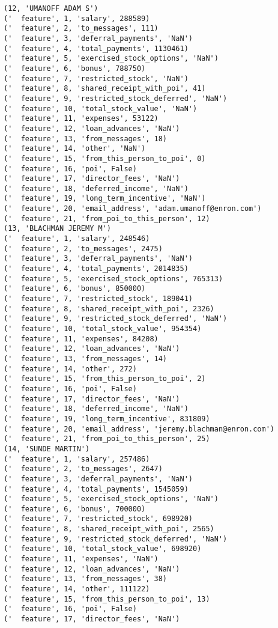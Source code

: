 \begin{verbatim}
(12, 'UMANOFF ADAM S')
('  feature', 1, 'salary', 288589)
('  feature', 2, 'to_messages', 111)
('  feature', 3, 'deferral_payments', 'NaN')
('  feature', 4, 'total_payments', 1130461)
('  feature', 5, 'exercised_stock_options', 'NaN')
('  feature', 6, 'bonus', 788750)
('  feature', 7, 'restricted_stock', 'NaN')
('  feature', 8, 'shared_receipt_with_poi', 41)
('  feature', 9, 'restricted_stock_deferred', 'NaN')
('  feature', 10, 'total_stock_value', 'NaN')
('  feature', 11, 'expenses', 53122)
('  feature', 12, 'loan_advances', 'NaN')
('  feature', 13, 'from_messages', 18)
('  feature', 14, 'other', 'NaN')
('  feature', 15, 'from_this_person_to_poi', 0)
('  feature', 16, 'poi', False)
('  feature', 17, 'director_fees', 'NaN')
('  feature', 18, 'deferred_income', 'NaN')
('  feature', 19, 'long_term_incentive', 'NaN')
('  feature', 20, 'email_address', 'adam.umanoff@enron.com')
('  feature', 21, 'from_poi_to_this_person', 12)
(13, 'BLACHMAN JEREMY M')
('  feature', 1, 'salary', 248546)
('  feature', 2, 'to_messages', 2475)
('  feature', 3, 'deferral_payments', 'NaN')
('  feature', 4, 'total_payments', 2014835)
('  feature', 5, 'exercised_stock_options', 765313)
('  feature', 6, 'bonus', 850000)
('  feature', 7, 'restricted_stock', 189041)
('  feature', 8, 'shared_receipt_with_poi', 2326)
('  feature', 9, 'restricted_stock_deferred', 'NaN')
('  feature', 10, 'total_stock_value', 954354)
('  feature', 11, 'expenses', 84208)
('  feature', 12, 'loan_advances', 'NaN')
('  feature', 13, 'from_messages', 14)
('  feature', 14, 'other', 272)
('  feature', 15, 'from_this_person_to_poi', 2)
('  feature', 16, 'poi', False)
('  feature', 17, 'director_fees', 'NaN')
('  feature', 18, 'deferred_income', 'NaN')
('  feature', 19, 'long_term_incentive', 831809)
('  feature', 20, 'email_address', 'jeremy.blachman@enron.com')
('  feature', 21, 'from_poi_to_this_person', 25)
(14, 'SUNDE MARTIN')
('  feature', 1, 'salary', 257486)
('  feature', 2, 'to_messages', 2647)
('  feature', 3, 'deferral_payments', 'NaN')
('  feature', 4, 'total_payments', 1545059)
('  feature', 5, 'exercised_stock_options', 'NaN')
('  feature', 6, 'bonus', 700000)
('  feature', 7, 'restricted_stock', 698920)
('  feature', 8, 'shared_receipt_with_poi', 2565)
('  feature', 9, 'restricted_stock_deferred', 'NaN')
('  feature', 10, 'total_stock_value', 698920)
('  feature', 11, 'expenses', 'NaN')
('  feature', 12, 'loan_advances', 'NaN')
('  feature', 13, 'from_messages', 38)
('  feature', 14, 'other', 111122)
('  feature', 15, 'from_this_person_to_poi', 13)
('  feature', 16, 'poi', False)
('  feature', 17, 'director_fees', 'NaN')

\end{verbatim}

